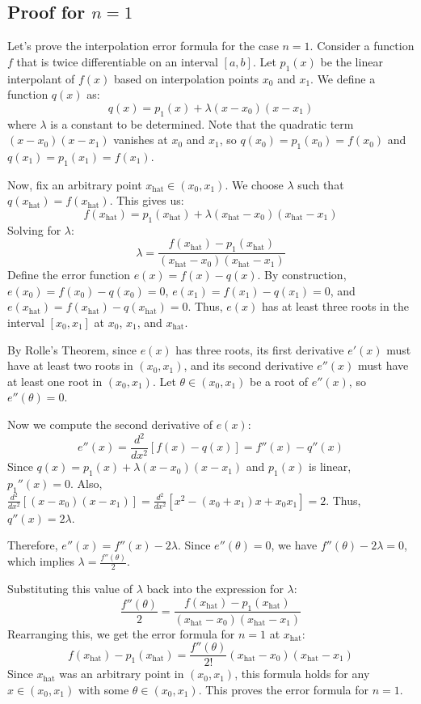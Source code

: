 \documentclass{article}
\begin{document}
\subsection{Proof for $n=1$}

Let's prove the interpolation error formula for the case $n=1$. Consider a function $f$ that is twice differentiable on an interval $[a, b]$. Let $p_1(x)$ be the linear interpolant of $f(x)$ based on interpolation points $x_0$ and $x_1$.  We define a function $q(x)$ as:
\[
q(x) = p_1(x) + \lambda (x - x_0)(x - x_1)
\]
where $\lambda$ is a constant to be determined. Note that the quadratic term $(x - x_0)(x - x_1)$ vanishes at $x_0$ and $x_1$, so $q(x_0) = p_1(x_0) = f(x_0)$ and $q(x_1) = p_1(x_1) = f(x_1)$.

Now, fix an arbitrary point $x_{\text{hat}} \in (x_0, x_1)$. We choose $\lambda$ such that $q(x_{\text{hat}}) = f(x_{\text{hat}})$. This gives us:
\[
f(x_{\text{hat}}) = p_1(x_{\text{hat}}) + \lambda (x_{\text{hat}} - x_0)(x_{\text{hat}} - x_1)
\]
Solving for $\lambda$:
\[
\lambda = \frac{f(x_{\text{hat}}) - p_1(x_{\text{hat}})}{(x_{\text{hat}} - x_0)(x_{\text{hat}} - x_1)}
\]
Define the error function $e(x) = f(x) - q(x)$. By construction, $e(x_0) = f(x_0) - q(x_0) = 0$, $e(x_1) = f(x_1) - q(x_1) = 0$, and $e(x_{\text{hat}}) = f(x_{\text{hat}}) - q(x_{\text{hat}}) = 0$. Thus, $e(x)$ has at least three roots in the interval $[x_0, x_1]$ at $x_0$, $x_1$, and $x_{\text{hat}}$.


By Rolle's Theorem, since $e(x)$ has three roots, its first derivative $e'(x)$ must have at least two roots in $(x_0, x_1)$, and its second derivative $e''(x)$ must have at least one root in $(x_0, x_1)$. Let $\theta \in (x_0, x_1)$ be a root of $e''(x)$, so $e''(\theta) = 0$.

Now we compute the second derivative of $e(x)$:
\[
e''(x) = \frac{d^2}{dx^2} [f(x) - q(x)] = f''(x) - q''(x)
\]
Since $q(x) = p_1(x) + \lambda (x - x_0)(x - x_1)$ and $p_1(x)$ is linear, $p_1''(x) = 0$. Also, $\frac{d^2}{dx^2} [(x - x_0)(x - x_1)] = \frac{d^2}{dx^2} [x^2 - (x_0+x_1)x + x_0x_1] = 2$. Thus, $q''(x) = 2\lambda$.

Therefore, $e''(x) = f''(x) - 2\lambda$.  Since $e''(\theta) = 0$, we have $f''(\theta) - 2\lambda = 0$, which implies $\lambda = \frac{f''(\theta)}{2}$.

Substituting this value of $\lambda$ back into the expression for $\lambda$:
\[
\frac{f''(\theta)}{2} = \frac{f(x_{\text{hat}}) - p_1(x_{\text{hat}})}{(x_{\text{hat}} - x_0)(x_{\text{hat}} - x_1)}
\]
Rearranging this, we get the error formula for $n=1$ at $x_{\text{hat}}$:
\[
f(x_{\text{hat}}) - p_1(x_{\text{hat}}) = \frac{f''(\theta)}{2!} (x_{\text{hat}} - x_0)(x_{\text{hat}} - x_1)
\]
Since $x_{\text{hat}}$ was an arbitrary point in $(x_0, x_1)$, this formula holds for any $x \in (x_0, x_1)$ with some $\theta \in (x_0, x_1)$.  This proves the error formula for $n=1$.
\end{document}
